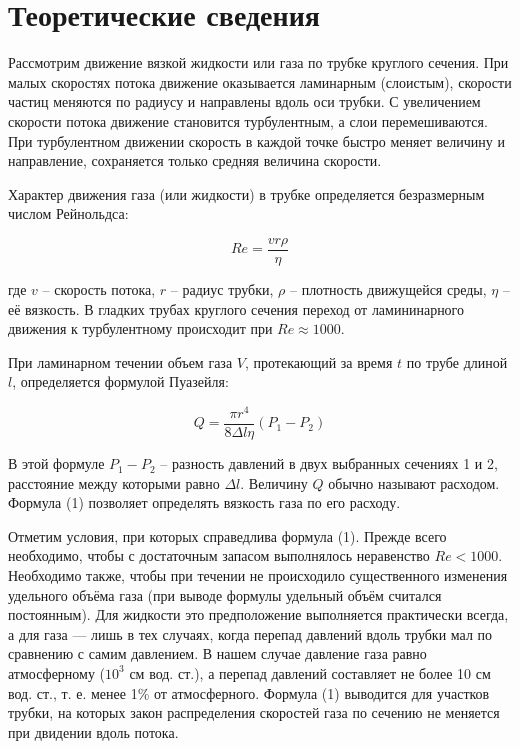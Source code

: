 \documentclass[a4paper,12pt]{article}
\begin{document}
\section{Теоретические сведения}

Рассмотрим движение вязкой жидкости или газа по трубке круглого сечения. При малых скоростях потока движение оказывается ламинарным (слоистым), скорости частиц меняются по радиусу и направлены вдоль оси трубки. С увеличением скорости потока движение становится турбулентным, а слои перемешиваются. При турбулентном движении скорость в каждой точке быстро меняет величину и направление, сохраняется только средняя величина скорости.

Характер движения газа (или жидкости) в трубке определяется безразмерным числом Рейнольдса:

\begin{equation}\label{1}
    Re = \frac{vr\rho}{\eta}
\end{equation}


где $v$ -- скорость потока, $r$ -- радиус трубки, $\rho$ -- плотность движущейся среды, $\eta$ -- её вязкость. В гладких трубах круглого сечения переход от ламининарного движения к турбулентному происходит при $Re \approx 1000$.

При ламинарном течении объем газа $V$, протекающий за время $t$ по трубе длиной $l$, определяется формулой Пуазейля:

\begin{equation}\label{2}
	Q = \frac{\pi r^4}{8 \Delta l \eta}(P_1 - P_2)
\end{equation}

В этой формуле $P_1 - P_2$ -- разность давлений в двух выбранных сечениях 1 и 2, расстояние между которыми равно $\Delta l$. Величину $Q$ обычно называют расходом. Формула (1) позволяет определять вязкость газа по его расходу.

Отметим условия, при которых справедлива формула (1). Прежде всего необходимо, чтобы с достаточным запасом выполнялось неравенство $Re < 1000$. Необходимо также, чтобы при течении не происходило существенного изменения удельного объёма газа (при выводе формулы удельный объём считался постоянным). Для жидкости это предположение выполняется практически всегда, а для газа --- лишь в тех случаях, когда перепад давлений вдоль трубки мал по сравнению с самим давлением. В нашем случае давление газа равно атмосферному ($10^3$ см вод. ст.), а перепад давлений составляет не более 10 см вод. ст., т. е. менее 1\% от атмосферного. Формула (1) выводится для участков трубки, на которых закон распределения скоростей газа по сечению не меняется при двидении вдоль потока.
\end{document}
